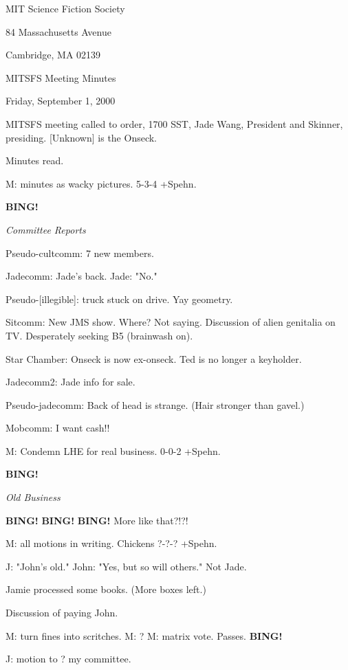 \documentclass[12pt]{article}
\newcommand{\bing}{{\bf BING!} }
\newcommand{\goto}[1]{\bing \vskip 12pt \centerline{{\em{#1}}}}
\begin{document}
\begin{center}

MIT Science Fiction Society 

84 Massachusetts Avenue

Cambridge, MA 02139

\vspace{12pt}

MITSFS Meeting Minutes 

Friday, September 1, 2000

\end{center}
 
\vspace{18pt}

\setlength{\parskip}{6pt}

\noindent
MITSFS meeting called to order, 1700 SST, Jade Wang, President and
Skinner, presiding. [Unknown] is the Onseck.

Minutes read.

M: minutes as wacky pictures. 5-3-4 +Spehn.

\goto{Committee Reports}

Pseudo-cultcomm: 7 new members.

Jadecomm: Jade's back. Jade: "No."

Pseudo-[illegible]: truck stuck on drive. Yay geometry.

Sitcomm: New JMS show. Where? Not saying. Discussion of alien genitalia on TV. Desperately seeking B5 (brainwash on).

Star Chamber: Onseck is now ex-onseck. Ted is no longer a keyholder.

Jadecomm2: Jade info for sale.

Pseudo-jadecomm: Back of head is strange. (Hair stronger than gavel.)

Mobcomm: I want cash!!

M: Condemn LHE for real business. 0-0-2 +Spehn.

\goto{Old Business}

\bing \bing \bing More like that?!?!

M: all motions in writing. Chickens ?-?-? +Spehn.

J: "John's old." John: "Yes, but so will others." Not Jade.

Jamie processed some books. (More boxes left.)

Discussion of paying John.

M: turn fines into scritches. M: ? M: matrix vote. Passes. \bing

J: motion to ? my committee.
\end{document}
